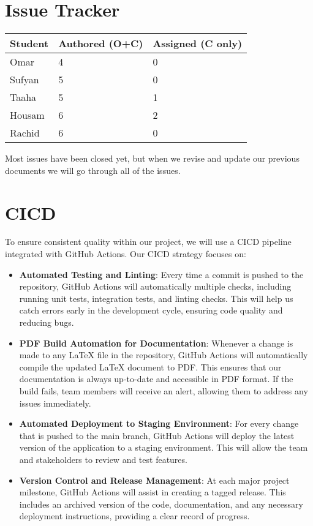 \documentclass{article}
\begin{document}
\section{Issue Tracker}

\begin{table}[H]
\centering
\begin{tabular}{lll}
\toprule
\textbf{Student} & \textbf{Authored (O+C)} & \textbf{Assigned (C only)}\\
\midrule
Omar & 4 & 0 \\
Sufyan & 5 & 0 \\
Taaha & 5 & 1 \\
Housam & 6 & 2 \\
Rachid & 6 & 0 \\
\bottomrule
\end{tabular}
\end{table}

Most issues have been closed yet, but when we revise and update our previous documents we will go through all of the issues. 
\section{CICD}

To ensure consistent quality within our project, we will use a CICD pipeline integrated with GitHub Actions. Our CICD strategy focuses on:

\begin{itemize}
    \item \textbf{Automated Testing and Linting}: Every time a commit is pushed to the repository, GitHub Actions will automatically multiple checks, including running unit tests, integration tests, and linting checks. This will help us catch errors early in the development cycle, ensuring code quality and reducing bugs.

    \item \textbf{PDF Build Automation for Documentation}: Whenever a change is made to any LaTeX file in the repository, GitHub Actions will automatically compile the updated LaTeX document to PDF. This ensures that our documentation is always up-to-date and accessible in PDF format. If the build fails, team members will receive an alert, allowing them to address any issues immediately.

    \item \textbf{Automated Deployment to Staging Environment}: For every change that is pushed to the main branch, GitHub Actions will deploy the latest version of the application to a staging environment. This will allow the team and stakeholders to review and test features. 

    \item \textbf{Version Control and Release Management}: At each major project milestone, GitHub Actions will assist in creating a tagged release. This includes an archived version of the code, documentation, and any necessary deployment instructions, providing a clear record of progress.

\end{itemize}
\end{document}
